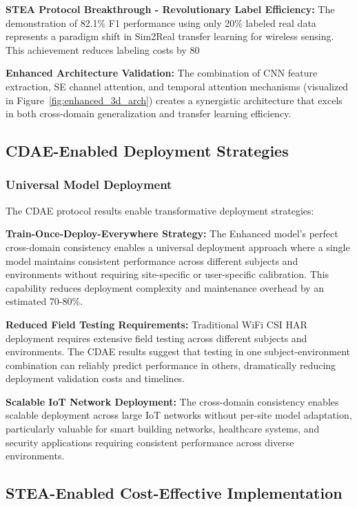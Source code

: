 \documentclass[journal]{IEEEtran}
\begin{document}
\textbf{STEA Protocol Breakthrough - Revolutionary Label Efficiency:} The demonstration of 82.1\% F1 performance using only 20\% labeled real data represents a paradigm shift in Sim2Real transfer learning for wireless sensing. This achievement reduces labeling costs by 80%

\textbf{Enhanced Architecture Validation:} The combination of CNN feature extraction, SE channel attention, and temporal attention mechanisms (visualized in Figure~\ref{fig:enhanced_3d_arch}) creates a synergistic architecture that excels in both cross-domain generalization and transfer learning efficiency.

\subsection{CDAE-Enabled Deployment Strategies}

\subsubsection{Universal Model Deployment}

The CDAE protocol results enable transformative deployment strategies:

\textbf{Train-Once-Deploy-Everywhere Strategy:} The Enhanced model's perfect cross-domain consistency enables a universal deployment approach where a single model maintains consistent performance across different subjects and environments without requiring site-specific or user-specific calibration. This capability reduces deployment complexity and maintenance overhead by an estimated 70-80\%.

\textbf{Reduced Field Testing Requirements:} Traditional WiFi CSI HAR deployment requires extensive field testing across different subjects and environments. The CDAE results suggest that testing in one subject-environment combination can reliably predict performance in others, dramatically reducing deployment validation costs and timelines.

\textbf{Scalable IoT Network Deployment:} The cross-domain consistency enables scalable deployment across large IoT networks without per-site model adaptation, particularly valuable for smart building networks, healthcare systems, and security applications requiring consistent performance across diverse environments.

\subsection{STEA-Enabled Cost-Effective Implementation}
\end{document}
